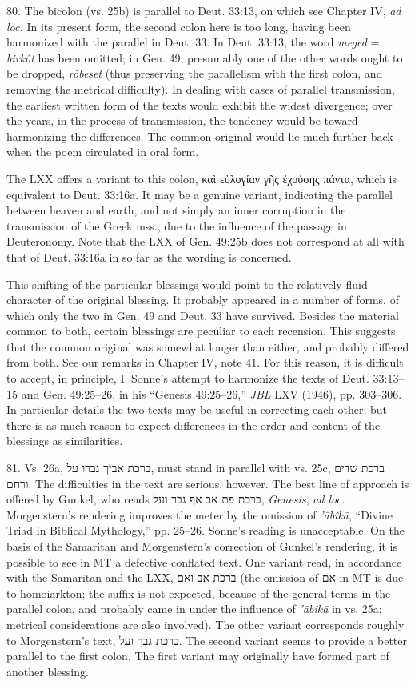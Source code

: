 \begin{enumerate}
80. The bicolon (vs. 25b) is parallel to Deut. 33:13, on which see Chapter IV,
\emph{ad loc.} In its present form, the second colon here is too long, having
been harmonized with the parallel in Deut. 33. In Deut. 33:13, the word
\emph{meged} = \emph{birkôt} has been omitted; in Gen. 49, presumably one of
the other words ought to be dropped, \emph{rōbeṣet} (thus preserving the
parallelism with the first colon, and removing the metrical difficulty). In
dealing with cases of parallel transmission, the earliest written form of the
texts would exhibit the widest divergence; over the years, in the process of
transmission, the tendency would be toward harmonizing the differences. The
common original would lie much further back when the poem circulated in oral
form.

The LXX offers a variant to this colon, καὶ εὐλογίαν γῆς ἐχούσης πάντα, which
is equivalent to Deut. 33:16a. It may be a genuine variant, indicating the
parallel between heaven and earth, and not simply an inner corruption in the
transmission of the Greek mss., due to the influence of the passage in
Deuteronomy. Note that the LXX of Gen. 49:25b does not correspond at all with
that of Deut. 33:16a in so far as the wording is concerned.

This shifting of the particular blessings would point to the relatively fluid
character of the original blessing. It probably appeared in a number of forms,
of which only the two in Gen. 49 and Deut. 33 have survived. Besides the
material common to both, certain blessings are peculiar to each recension. This
suggests that the common original was somewhat longer than either, and probably
differed from both. See our remarks in Chapter IV, note 41. For this reason, it
is difficult to accept, in principle, I. Sonne's attempt to harmonize the texts
of Deut. 33:13--15 and Gen. 49:25--26, in his ``Genesis 49:25--26,'' \emph{JBL}
LXV (1946), pp. 303--306. In particular details the two texts may be useful in
correcting each other; but there is as much reason to expect differences in the
order and content of the blessings as similarities.

81. Vs. 26a, ברכת אביך גברו על, must stand in parallel with vs. 25c,
ברכת שדים ורחם. The difficulties in the text are serious, however. The best
line of approach is offered by Gunkel, who reads ברכת פת אב אף גבר ועל,
\emph{Genesis}, \emph{ad loc.} Morgenstern's rendering improves the meter by
the omission of \emph{'ābîkā}, ``Divine Triad in Biblical Mythology,''
pp. 25--26. Sonne's reading is unacceptable. On the basis of the Samaritan and
Morgenstern's correction of Gunkel's rendering, it is possible to see in MT a
defective conflated text. One variant read, in accordance with the Samaritan
and the LXX, ברכת אב ואם (the omission of אם in MT is due to homoiarkton; the
suffix is not expected, because of the general terms in the parallel colon,
and probably came in under the influence of \emph{'ābîkā} in vs. 25a;
metrical considerations are also involved). The other variant corresponds
roughly to Morgenstern's text, ברכת גבר ועל. The second variant seems to
provide a better parallel to the first colon. The first variant may originally
have formed part of another blessing.


\end{enumerate}
